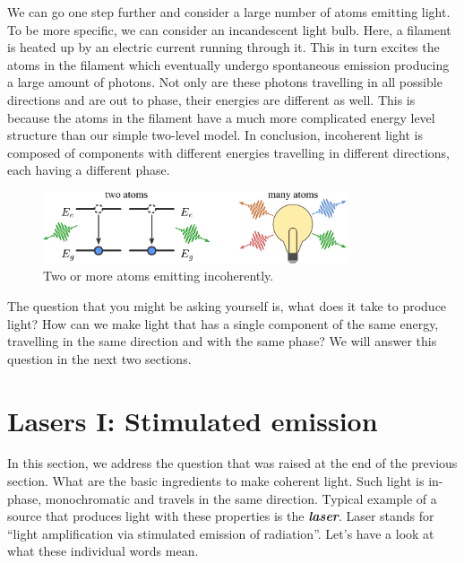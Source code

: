 We can go one step further and consider a large number of atoms emitting light.
To be more specific, we can consider an incandescent light bulb.
Here, a filament is heated up by an electric current running through it.
This in turn excites the atoms in the filament which eventually undergo spontaneous emission producing a large amount of photons.
Not only are these photons travelling in all possible directions and are out to phase, their energies are different as well.
This is because the atoms in the filament have a much more complicated energy level structure than our simple two-level model.
In conclusion, incoherent light is composed of components with different energies travelling in different directions, each having a different phase.

\begin{figure}
    \centering
    \includegraphics[width=0.8\textwidth]{lesson5/5-2_incoherent_emission.pdf}
    \caption[Incoherent emission]{Two or more atoms emitting incoherently.}
    \label{fig:5-2_incoherent_emission}
\end{figure}

The question that you might be asking yourself is, what does it take to produce light?
How can we make light that has a single component of the same energy, travelling in the same direction and with the same phase?
We will answer this question in the next two sections.



\section{Lasers I: Stimulated emission}
\label{sec:5-3_lasers1}


In this section, we address the question that was raised at the end of the previous section.
What are the basic ingredients to make coherent light.
Such light is in-phase, monochromatic and travels in the same direction.
Typical example of a source that produces light with these properties is the \textit{\textbf{laser}}.
Laser stands for ``light amplification via stimulated emission of radiation''.
Let's have a look at what these individual words mean.

